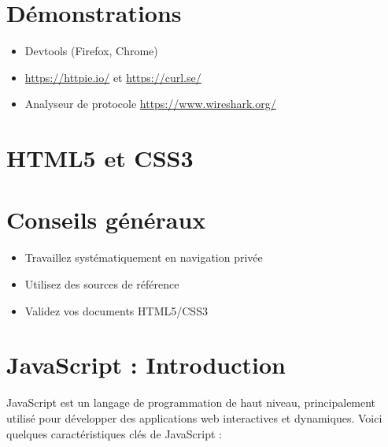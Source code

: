 \documentclass{article}
\begin{document}
\section{Démonstrations}
\begin{itemize}
    \item Devtools (Firefox, Chrome)
    \item \url{https://httpie.io/} et \url{https://curl.se/}
    \item Analyseur de protocole \url{https://www.wireshark.org/}
\end{itemize}

\section{HTML5 et CSS3}
\section{Conseils généraux}
\begin{itemize}
    \item Travaillez systématiquement en navigation privée
    \item Utilisez des sources de référence
    \item Validez vos documents HTML5/CSS3
\end{itemize}


\section{JavaScript : Introduction}

JavaScript est un langage de programmation de haut niveau, principalement utilisé pour développer des applications web interactives et dynamiques. Voici quelques caractéristiques clés de JavaScript :
\end{document}
